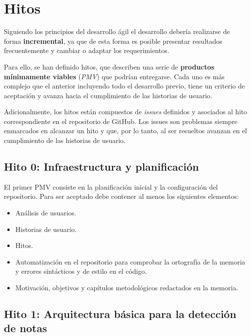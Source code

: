 \section{Hitos}

Siguiendo los principios del desarrollo ágil el desarrollo debería realizarse de forma \textbf{incremental}, ya que de esta forma es posible presentar resultados frecuentemente y cambiar o adaptar los requerimientos.

Para ello, se han definido hitos, que describen una serie de \textbf{productos mínimamente viables} (\textit{PMV}) que podrían entregarse. Cada uno es más complejo que el anterior incluyendo todo el desarrollo previo, tiene un criterio de aceptación y avanza hacia el cumplimiento de las historias de usuario.

Adicionalmente, los hitos están compuestos de \textit{issues} definidos y asociados al hito correspondiente en el repositorio de GitHub. Los issues son problemas siempre enmarcados en alcanzar un hito y que, por lo tanto, al ser resueltos avanzan en el cumplimiento de las historias de usuario.


\subsection*{Hito 0: Infraestructura y planificación}

El primer PMV consiste en la planificación inicial y la configuración del repositorio. Para ser aceptado debe contener al menos los siguientes elementos:

\begin{itemize}
	\item{Análisis de usuarios.}
	\item{Historias de usuario.}
	\item{Hitos.}
	\item{Automatización en el repositorio para comprobar la ortografía de la memoria y errores sintácticos y de estilo en el código.}
	\item{Motivación, objetivos y capítulos metodológicos redactados en la memoria.}
\end{itemize}

\subsection*{Hito 1: Arquitectura básica para la detección de notas}

